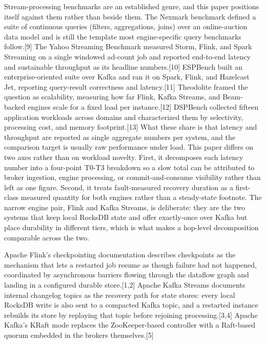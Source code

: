 \documentclass[
]{article}
\begin{document}
Stream-processing benchmarks are an established genre, and this paper
positions itself against them rather than beside them. The Nexmark
benchmark defined a suite of continuous queries (filters, aggregations,
joins) over an online-auction data model and is still the template most
engine-specific query benchmarks follow.{[}9{]} The Yahoo Streaming
Benchmark measured Storm, Flink, and Spark Streaming on a single
windowed ad-count job and reported end-to-end latency and sustainable
throughput as its headline numbers.{[}10{]} ESPBench built an
enterprise-oriented suite over Kafka and ran it on Spark, Flink, and
Hazelcast Jet, reporting query-result correctness and latency.{[}11{]}
Theodolite framed the question as scalability, measuring how far Flink,
Kafka Streams, and Beam-backed engines scale for a fixed load per
instance.{[}12{]} DSPBench collected fifteen application workloads
across domains and characterized them by selectivity, processing cost,
and memory footprint.{[}13{]} What these share is that latency and
throughput are reported as single aggregate numbers per system, and the
comparison target is usually raw performance under load. This paper
differs on two axes rather than on workload novelty. First, it
decomposes each latency number into a four-point T0-T3 breakdown so a
slow total can be attributed to broker ingestion, engine processing, or
commit-and-consume visibility rather than left as one figure. Second, it
treats fault-measured recovery duration as a first-class measured quantity for both
engines rather than a steady-state footnote. The narrow engine pair,
Flink and Kafka Streams, is deliberate: they are the two systems that
keep local RocksDB state and offer exactly-once over Kafka but place
durability in different tiers, which is what makes a hop-level
decomposition comparable across the two.

Apache Flink's checkpointing documentation describes checkpoints as the
mechanism that lets a restarted job resume as though failure had not
happened, coordinated by asynchronous barriers flowing through the
dataflow graph and landing in a configured durable store.{[}1,2{]}
Apache Kafka Streams documents internal changelog topics as the recovery
path for state stores: every local RocksDB write is also sent to a
compacted Kafka topic, and a restarted instance rebuilds its store by
replaying that topic before rejoining processing.{[}3,4{]} Apache
Kafka's KRaft mode replaces the ZooKeeper-based controller with a
Raft-based quorum embedded in the brokers themselves.{[}5{]}
\end{document}
